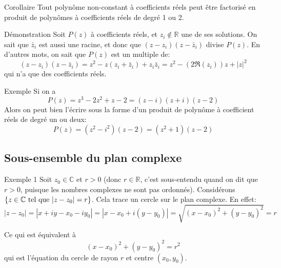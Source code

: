 \documentclass[a4paper]{article}
\begin{document}
\begin{parag}{Corollaire}
    Tout polynôme non-constant à coefficients réels peut être factorisé en produit de polynômes à coefficients réels de degré 1 ou 2.

    \begin{subparag}{Démonstration}
        Soit $P\left(z\right)$ à coefficients réels, et $z_i \not \in \mathbb{R}$ une de ses solutions. On sait que $\bar{z}_i$ est aussi une racine, et donc que $\left(z - z_i\right)\left(z - \bar{z}_i\right)$ divise $P(z)$. En d'autres mots, on sait que $P\left(z\right)$ est un multiple de:
        \[\left(z - z_i\right)\left(z - \bar{z}_i\right) = z^2 - z\left(z_i + \bar{z}_i\right) + z_i \bar{z}_i = z^2 - \left(2\Re\left(z_i\right)\right)z + \left|z\right|^2 \]
        qui n'a que des coefficients réels.
    \end{subparag}


    \begin{subparag}{Exemple}
        Si on a
        \[P\left(z\right) = z^3 - 2z^2 + z - 2 = \left(z-i\right)\left(z + i\right)\left(z- 2\right)\]
        Alors on peut bien l'écrire sous la forme d'un produit de polynôme à coefficient réels de degré un ou deux:
        \[P\left(z\right) = \left(z^2 - i^2\right)\left(z - 2\right) = \left(z^2 + 1\right)\left(z - 2\right)\]

    \end{subparag}

\end{parag}

\subsection{Sous-ensemble du plan complexe}
\begin{parag}{Exemple 1}
    Soit $z_0 \in \mathbb{C}$ et $r > 0$ (donc $r \in \mathbb{R}$, c'est sous-entendu quand on dit que $r > 0$, puisque les nombres complexes ne sont pas ordonnés). Considérons $\left\{z \in \mathbb{C} \telque \left|z - z_0\right| = r\right\}$. Cela trace un cercle sur le plan complexe. En effet:
    \[\left|z - z_0\right| = \left|x + iy - x_0 - iy_0\right| = \left|x - x_0 + i\left(y - y_0\right)\right| = \sqrt{\left(x - x_0\right)^2 + \left(y - y_0\right)^2} = r\]

    Ce qui est équivalent à
    \[\left(x - x_0\right)^2 + \left(y - y_0\right)^2 = r^2\]
    qui est l'équation du cercle de rayon $r$ et centre $\left(x_0, y_0\right)$.

\end{parag}
\end{document}
